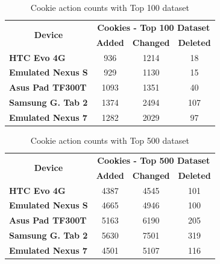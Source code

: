 \documentclass{acm_proc_article-sp}
\begin{document}
\begin{table}[h]
  \centering
  \caption{Cookie action counts with Top 100 dataset}
    \begin{tabular}{|c|c|c|c|}
    \hline
    \multicolumn{1}{|c|}{\multirow{2}[4]{*}{\textbf{Device}}} & \multicolumn{3}{|c|}{\textbf{Cookies - Top 100 Dataset}} \\ \cline{2-4}
    \multicolumn{1}{|c|}{} & \multicolumn{1}{|c|}{\textbf{Added}} & \multicolumn{1}{|c|}{\textbf{Changed}} & \multicolumn{1}{|c|}{\textbf{Deleted}} \\ \hline
    \multicolumn{1}{|l|}{\textbf{HTC Evo 4G}} & 936   & 1214  & 18 \\
    \multicolumn{1}{|l|}{\textbf{Emulated Nexus S}} & 929   & 1130  & 15 \\
    \multicolumn{1}{|l|}{\textbf{Asus Pad TF300T}} & 1093  & 1351  & 40 \\
    \multicolumn{1}{|l|}{\textbf{Samsung G. Tab 2}} & 1374  & 2494  & 107 \\
    \multicolumn{1}{|l|}{\textbf{Emulated Nexus 7}} & 1282  & 2029  & 97 \\ \hline
    \end{tabular}%
  \label{tab:cookie_counts_100}%
\end{table}%

\begin{table}[h]
  \centering
  \caption{Cookie action counts with Top 500 dataset}
    \begin{tabular}{|c|c|c|c|}
    \hline
    \multicolumn{1}{|c|}{\multirow{2}[4]{*}{\textbf{Device}}} & \multicolumn{3}{|c|}{\textbf{Cookies - Top 500 Dataset}} \\ \cline{2-4}
    \multicolumn{1}{|c|}{} & \multicolumn{1}{|c|}{\textbf{Added}} & \multicolumn{1}{|c|}{\textbf{Changed}} & \multicolumn{1}{|c|}{\textbf{Deleted}} \\ \hline
    \multicolumn{1}{|l|}{\textbf{HTC Evo 4G}} & 4387  & 4545  & 101 \\
    \multicolumn{1}{|l|}{\textbf{Emulated Nexus S}} & 4665  & 4946  & 100 \\
    \multicolumn{1}{|l|}{\textbf{Asus Pad TF300T}} & 5163  & 6190  & 205 \\
    \multicolumn{1}{|l|}{\textbf{Samsung G. Tab 2}} & 5630  & 7501  & 319 \\
    \multicolumn{1}{|l|}{\textbf{Emulated Nexus 7}} & 4501  & 5107  & 116 \\ \hline
    \end{tabular}%
  \label{tab:cookie_counts_500}%
\end{table}%
\end{document}

